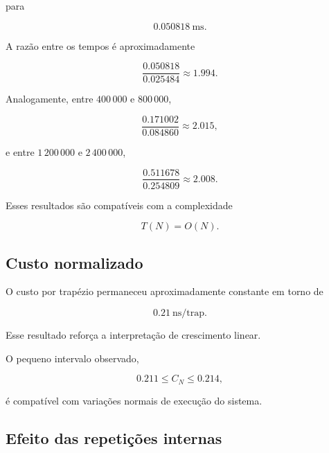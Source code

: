 para

\begin{equation}
    0.050818\ \text{ms}.
\end{equation}

A razão entre os tempos é aproximadamente

\begin{equation}
    \frac{0.050818}{0.025484}
    \approx
    1.994.
\end{equation}

Analogamente, entre \(400\,000\) e \(800\,000\),

\begin{equation}
    \frac{0.171002}{0.084860}
    \approx
    2.015,
\end{equation}

e entre \(1\,200\,000\) e \(2\,400\,000\),

\begin{equation}
    \frac{0.511678}{0.254809}
    \approx
    2.008.
\end{equation}

Esses resultados são compatíveis com a complexidade

\begin{equation}
    T(N)=O(N).
\end{equation}

\subsection{Custo normalizado}

O custo por trapézio permaneceu aproximadamente constante em torno de

\begin{equation}
    0.21\ \text{ns/trap}.
\end{equation}

Esse resultado reforça a interpretação de crescimento linear.

O pequeno intervalo observado,

\begin{equation}
    0.211
    \leq
    C_N
    \leq
    0.214,
\end{equation}

é compatível com variações normais de execução do sistema.

\subsection{Efeito das repetições internas}

